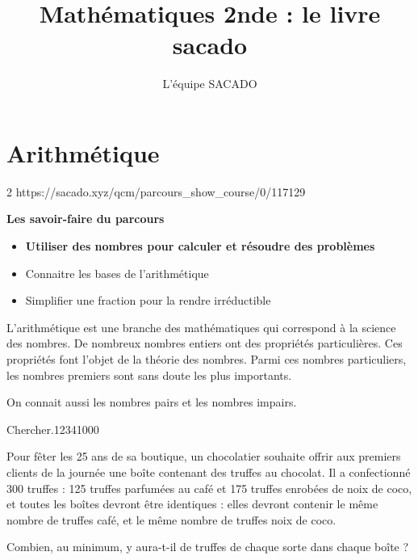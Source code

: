 



\title{Mathématiques 2nde  : le livre sacado}
\author{L'équipe SACADO}

\parindent=0pt





\chapter{Arithmétique}{2}
{https://sacado.xyz/qcm/parcours_show_course/0/117129}
{


\begin{CpsCol}
 \textbf{Les savoir-faire du parcours}
 \begin{itemize}
 \item \textbf{Utiliser des nombres pour calculer et résoudre des problèmes}
 \item Connaitre les bases de l'arithmétique
 \item Simplifier une fraction pour la rendre irréductible
 \end{itemize}
\end{CpsCol}

\begin{His}

  
L'arithmétique est une branche des mathématiques qui correspond à la science des nombres. De nombreux nombres entiers ont des propriétés particulières. Ces propriétés font l'objet de la théorie des nombres. Parmi ces nombres particuliers, les nombres premiers sont sans doute les plus importants.

On connait aussi les nombres pairs et les nombres impairs. 

\end{His}

 

\begin{ExoDec}{Chercher.}{1234}{1}{0}{0}{0}

Pour fêter les 25 ans de sa boutique, un chocolatier souhaite offrir aux premiers clients de la journée une boîte contenant des truffes au chocolat.
Il a confectionné 300 truffes : 125 truffes parfumées au café et 175 truffes enrobées de noix de coco, et toutes les boîtes devront être identiques : elles
devront contenir le même nombre de truffes café, et le même nombre
de truffes noix de coco.

Combien, au minimum,  y aura-t-il de truffes de chaque sorte dans chaque boîte ?
 
\end{ExoDec}



}

